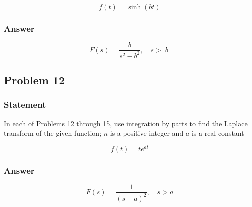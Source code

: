 \documentclass[12pt]{article}
\begin{document}
    \begin{equation*}
f(t)=\sinh (b t)
\end{equation*}
\subsubsection*{Answer}
\label{sec:org795b8fd}
    \begin{equation*}
F(s)=\frac{b}{s^{2}-b^{2}}, \quad s>|b|
\end{equation*}
\subsection*{Problem 12}
\label{sec:org27c5a6e}
\subsubsection*{Statement}
\label{sec:org78b8dfc}
In each of Problems 12 through 15, use integration by parts to find the Laplace
transform of the given function; \(n\) is a positive integer and \(a\) is a real
constant 

    \begin{equation*}
f(t)=t e^{a t}
\end{equation*}
\subsubsection*{Answer}
\label{sec:org5cac3a9}
    \begin{equation*}
F(s)=\frac{1}{(s-a)^{2}}, \quad s>a
\end{equation*}
\end{document}

